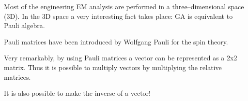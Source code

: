 \documentclass[10pt]{beamer}
\begin{document}
\begin{frame}[fragile]{}

Most of the engineering EM analysis are performed in a three--dimensional space (3D). 
In the 3D space a very interesting fact takes place: \alert{GA is equivalent to Pauli algebra}.

Pauli matrices have been introduced by Wolfgang Pauli 
for the spin theory.

Very remarkably, \alert{by using Pauli matrices a vector can be represented as a 2x2 matrix}. 
Thus it is possible to multiply vectors by multiplying the relative matrices. 

\alert{It is also possible to make the inverse of a vector!}
\end{frame}

\end{document}
